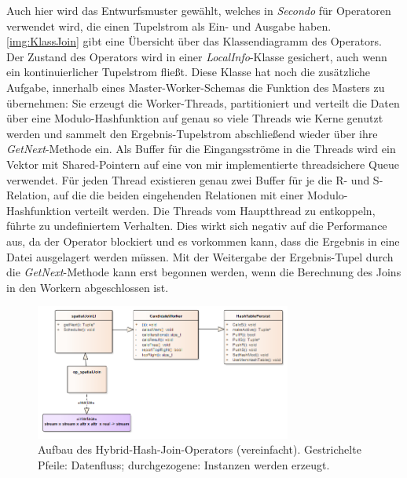 \documentclass[a4paper,12pt,twoside]{article}
\newcommand{\Fb}[1]{\textit{#1}} %
\begin{document}
Auch hier wird das Entwurfsmuster gewählt, welches in \Fb{Secondo} für Operatoren verwendet wird, die einen Tupelstrom als Ein- und Ausgabe haben. \autoref{img:KlassJoin} gibt eine Übersicht über das Klassendiagramm des Operators. Der Zustand des Operators wird in einer \Fb{LocalInfo}-Klasse gesichert, auch wenn ein kontinuierlicher Tupelstrom fließt. Diese Klasse hat noch die zusätzliche Aufgabe, innerhalb eines Master-Worker-Schemas die Funktion des Masters zu übernehmen: Sie erzeugt die Worker-Threads, partitioniert und verteilt die Daten über eine Modulo-Hashfunktion auf genau so viele Threads wie Kerne genutzt werden und sammelt den Ergebnis-Tupelstrom abschließend wieder über ihre \Fb{GetNext}-Methode ein. Als Buffer für die Eingangsströme in die Threads wird ein Vektor mit Shared-Pointern auf eine von mir implementierte threadsichere Queue verwendet. Für jeden Thread existieren genau zwei Buffer für je die R- und S-Relation, auf die die beiden eingehenden Relationen mit einer Modulo-Hashfunktion verteilt werden. Die Threads vom Hauptthread zu entkoppeln, führte zu undefiniertem Verhalten. Dies wirkt sich negativ auf die Performance aus, da der Operator blockiert und es vorkommen kann, dass die Ergebnis in eine Datei ausgelagert werden müssen. Mit der Weitergabe der Ergebnis-Tupel durch die \Fb{GetNext}-Methode kann erst begonnen werden, wenn die Berechnung des Joins in den Workern abgeschlossen ist. 

\begin{figure}
	\centering
	\includegraphics[width=0.75\textwidth]{Bilder/hybridJoin.png}
	\caption{Aufbau des Hybrid-Hash-Join-Operators (vereinfacht). Gestrichelte Pfeile: Datenfluss; durchgezogene: Instanzen werden erzeugt.}
	\label{img:KlassJoin}
\end{figure}
\end{document}
